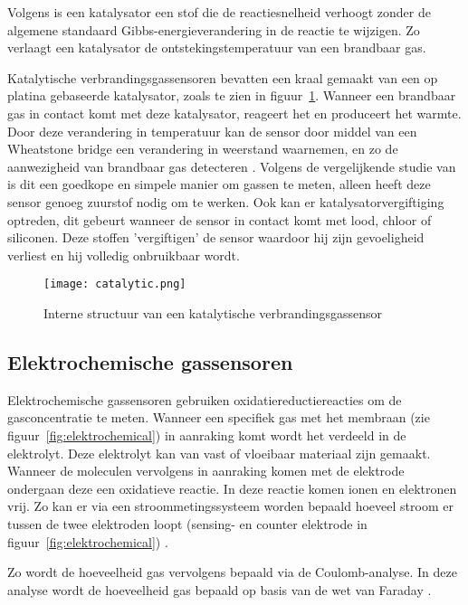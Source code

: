 Volgens \textcite{IUPAC2019} is een katalysator een stof die de reactiesnelheid verhoogt zonder de algemene standaard Gibbs-energieverandering in de reactie te wijzigen. Zo verlaagt een katalysator de ontstekingstemperatuur van een brandbaar gas.

Katalytische verbrandingsgassensoren bevatten een kraal gemaakt van een op platina gebaseerde katalysator, zoals te zien in figuur~\ref{fig:catalytic}. Wanneer een brandbaar gas in contact komt met deze katalysator, reageert het en produceert het warmte. Door deze verandering in temperatuur kan de sensor door middel van een Wheatstone bridge een verandering in weerstand waarnemen, en zo de aanwezigheid van brandbaar gas detecteren \autocite{CCGS2005}. Volgens de vergelijkende studie van \textcite{review2014} is dit een goedkope en simpele manier om gassen te meten, alleen heeft deze sensor genoeg zuurstof nodig om te werken. Ook kan er katalysatorvergiftiging optreden, dit gebeurt wanneer de sensor in contact komt met lood, chloor of siliconen. Deze stoffen 'vergiftigen' de sensor waardoor hij zijn gevoeligheid verliest en hij volledig onbruikbaar wordt.

\begin{figure}[h]
    \texttt{[image: catalytic.png]}
    \caption[Structuur katalytische gassensor]{Interne structuur van een katalytische verbrandingsgassensor \autocite{gastec2016}}
    \label{fig:catalytic}
\end{figure}


\subsection{Elektrochemische gassensoren}
\label{subsec:elektrochemische}

Elektrochemische gassensoren gebruiken oxidatiereductiereacties om de gasconcentratie te meten. Wanneer een specifiek gas met het membraan (zie figuur~\ref{fig:elektrochemical}) in aanraking komt wordt het verdeeld in de elektrolyt. Deze elektrolyt kan van vast of vloeibaar materiaal zijn gemaakt. Wanneer de moleculen vervolgens in aanraking komen met de elektrode ondergaan deze een oxidatieve reactie. In deze reactie komen ionen en elektronen vrij. Zo kan er via een stroommetingssysteem worden bepaald hoeveel stroom er tussen de twee elektroden loopt (sensing- en counter elektrode in figuur~\ref{fig:elektrochemical}) \autocite{Stetter2008}.

Zo wordt de hoeveelheid gas vervolgens bepaald via de Coulomb-analyse. In deze analyse wordt de hoeveelheid gas bepaald op basis van de wet van Faraday \autocite{gvda2023}.

